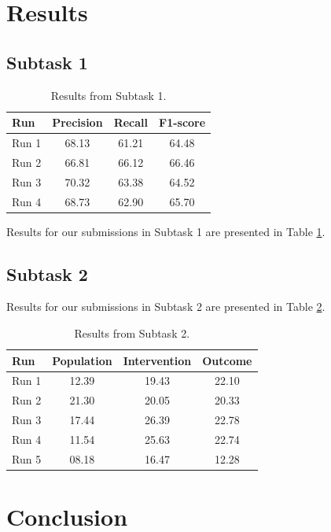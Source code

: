 \documentclass[11pt]{article}
\begin{document}
\section{Results}

\subsection{Subtask 1}

\begin{table}[ht]
    \centering
    \begin{tabular}{lccc}
        \toprule
        Run & Precision & Recall & F1-score \\
        \midrule
        Run 1 & 68.13 & 61.21 & 64.48 \\
        Run 2 & 66.81 & 66.12 & 66.46 \\
        Run 3 & 70.32 & 63.38 & 64.52 \\
        Run 4 & 68.73 & 62.90 & 65.70 \\
        \bottomrule
    \end{tabular}
    \caption{Results from Subtask 1.}
    \label{tab:task_1}
\end{table}

Results for our submissions in Subtask 1 are presented in Table \ref{tab:task_1}.
%
%
%
\subsection{Subtask 2}
\label{res:task2}
%
Results for our submissions in Subtask 2 are presented in Table \ref{tab:task_2}.
%
\begin{table}[ht]
    \centering
    \begin{tabular}{lccc}
        \toprule
        Run & Population & Intervention & Outcome \\
        \midrule
        Run 1 & 12.39 & 19.43 & 22.10 \\
        Run 2 & 21.30 & 20.05 & 20.33 \\
        Run 3 & 17.44 & 26.39 & 22.78 \\
        Run 4 & 11.54 & 25.63 & 22.74 \\
        Run 5 & 08.18 & 16.47 & 12.28 \\
        \bottomrule
    \end{tabular}
    \caption{Results from Subtask 2.}
    \label{tab:task_2}
\end{table}


\section{Conclusion}
\end{document}
